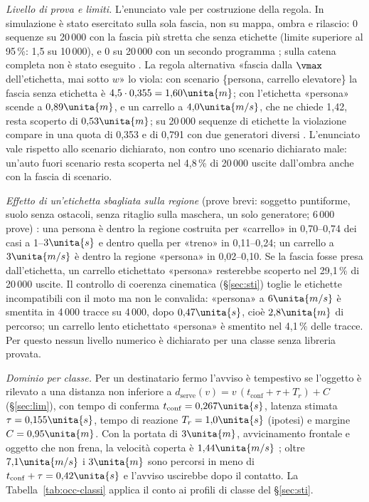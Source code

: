 \emph{Livello di prova e limiti.} L'enunciato vale per costruzione della regola. In simulazione è stato esercitato sulla sola fascia, non su mappa, ombra e rilascio: 0 sequenze su 20\,000 con la fascia più stretta che senza etichette (limite superiore al 95\,\%: 1,5 su 10\,000), e 0 su 20\,000 con un secondo programma ; sulla catena completa non è stato eseguito . La regola alternativa «fascia dalla $\vmax$ dell'etichetta, mai sotto $w$» lo viola: con scenario \{persona, carrello elevatore\} la fascia senza etichetta è $4{,}5\cdot0{,}355=1{,}60\unita{m}$; con l'etichetta «persona» scende a $0{,}89\unita{m}$, e un carrello a $4{,}0\unita{m/s}$, che ne chiede 1,42, resta scoperto di $0{,}53\unita{m}$; su 20\,000 sequenze di etichette la violazione compare in una quota di 0,353 e di 0,791 con due generatori diversi . L'enunciato vale rispetto allo scenario dichiarato, non contro uno scenario dichiarato male: un'auto fuori scenario resta scoperta nel 4,8\,\% di 20\,000 uscite dall'ombra anche con la fascia di scenario.

\emph{Effetto di un'etichetta sbagliata sulla regione} (prove brevi: soggetto puntiforme, suolo senza ostacoli, senza ritaglio sulla maschera, un solo generatore; 6\,000 prove) : una persona è dentro la regione costruita per «carrello» in 0,70--0,74 dei casi a 1--$3\unita{s}$ e dentro quella per «treno» in 0,11--0,24; un carrello a $3\unita{m/s}$ è dentro la regione «persona» in 0,02--0,10. Se la fascia fosse presa dall'etichetta, un carrello etichettato «persona» resterebbe scoperto nel 29,1\,\% di 20\,000 uscite. Il controllo di coerenza cinematica (\S\ref{sec:sti}) toglie le etichette incompatibili con il moto ma non le convalida: «persona» a $6\unita{m/s}$ è smentita in 4\,000 tracce su 4\,000, dopo $0{,}47\unita{s}$, cioè $2{,}8\unita{m}$ di percorso; un carrello lento etichettato «persona» è smentito nel 4,1\,\% delle tracce. Per questo nessun livello numerico è dichiarato per una classe senza libreria provata.

\emph{Dominio per classe.} Per un destinatario fermo l'avviso è tempestivo se l'oggetto è rilevato a una distanza non inferiore a $d_{\mathrm{serve}}(v)=v\,(t_{\mathrm{conf}}+\tau+T_r)+C$ (\S\ref{sec:lim}), con tempo di conferma $t_{\mathrm{conf}}=0{,}267\unita{s}$, latenza stimata $\tau=0{,}155\unita{s}$, tempo di reazione $T_r=1{,}0\unita{s}$ (ipotesi) e margine $C=0{,}95\unita{m}$. Con la portata di $3\unita{m}$, avvicinamento frontale e oggetto che non frena, la velocità coperta è $1{,}44\unita{m/s}$ ; oltre $7{,}1\unita{m/s}$ i $3\unita{m}$ sono percorsi in meno di $t_{\mathrm{conf}}+\tau=0{,}42\unita{s}$ e l'avviso uscirebbe dopo il contatto. La Tabella~\ref{tab:occ-classi} applica il conto ai profili di classe del \S\ref{sec:sti}.

